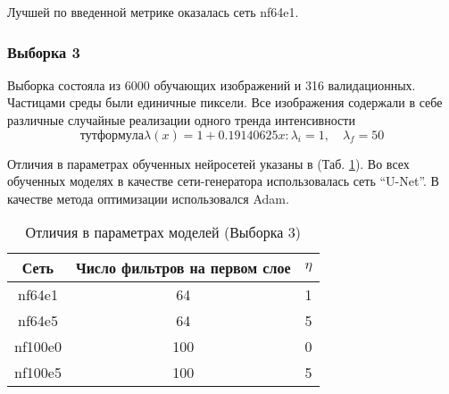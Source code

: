 			Лучшей по введенной метрике оказалась сеть nf64e1.
			\break
		\subsubsection{Выборка 3}
			Выборка состояла из 6000 обучающих изображений и 316 валидационных. Частицами среды были единичные пиксели. Все изображения содержали в себе различные случайные реализации одного тренда интенсивности
			$$тут формула \lambda(x) = 1 + 0.19140625x: \lambda_i = 1, \quad \lambda_f = 50$$
			
			Отличия в параметрах обученных нейросетей указаны в (Таб. \ref{8-dust-trend1-nns}). Во всех обученных моделях в качестве сети-генератора использовалась сеть ``U-Net''. В качестве метода оптимизации использовался Adam.
			
			\begin{table}[h!]
				\begin{center}
					\begin{tabular}{|c|c|c|}
						\hline
						Сеть & Число фильтров на первом слое & $\eta$ \\
						\hline
						nf64e1 & 64 & 1 \\
						\hline
						nf64e5 & 64 & 5 \\
						\hline
						nf100e0 & 100 & 0 \\
						\hline
						nf100e5 & 100 & 5 \\
						\hline
					\end{tabular}
					\caption{Отличия в параметрах моделей (Выборка 3)}
					\label{8-dust-trend1-nns}
				\end{center}
			\end{table}
			

